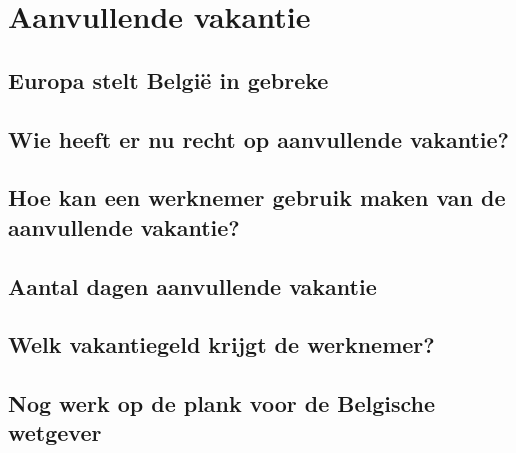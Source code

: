 \section{Aanvullende vakantie}

\subsection{Europa stelt België in gebreke}

\subsection{Wie heeft er nu recht op aanvullende vakantie?}

\subsection{Hoe kan een werknemer gebruik maken van de aanvullende vakantie?}

\subsection{Aantal dagen aanvullende vakantie}

\subsection{Welk vakantiegeld krijgt de werknemer?}

\subsection{Nog werk op de plank voor de Belgische wetgever}

